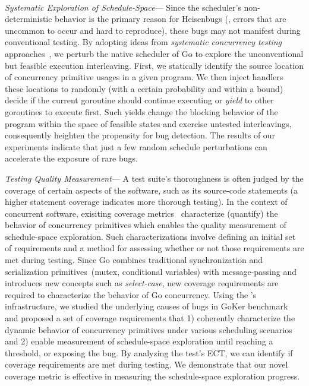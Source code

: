 \\
 \textit{Systematic Exploration of Schedule-Space}---
Since the scheduler's non-deterministic behavior is the primary reason for Heisenbugs (\ie, errors that are uncommon to occur and hard to reproduce), these bugs may not manifest during conventional testing.
%
By adopting ideas from \textit{systematic concurrency testing} approaches~\cite{dpor,thomson-concurrencyTesting-ppopp14,emmi-delayBounded-popl11,burckhardt-depthBug-asplos10,madanlal-preemptionBound-pldi07,yu-maple-oopsla12,joshi-calfuzzer,contest-jgi01,edelstein2003contest,hong-syncTesting-issta12,christakis-erlang-icst13,yuan-morpheus-asplos20}, we perturb the native scheduler of Go to explore the unconventional but feasible execution interleaving.
%
First, we statically identify the source location of concurrency primitive usages in a given program.
%
We then inject handlers these locations to randomly (with a certain probability and within a bound) decide if the current goroutine should continue executing or \textit{yield} to other goroutines to execute first.
%
Such yields change the blocking behavior of the program within the space of feasible states and exercise untested interleavings, consequently heighten the propensity for bug detection.
%
The results of our experiments indicate that just a few random schedule perturbations can accelerate the exposure of rare bugs.

 \textit{Testing Quality Measurement}---
A test suite's thoroughness is often judged by the coverage of certain aspects of the software, such as its source-code statements (a higher statement coverage indicates more thorough testing).
%
In the context of concurrent software, exisiting coverage metrics~\cite{edelstein2003contest,trainin-followsCoverage-padtad09,hong-syncTesting-issta12,yu-pset-isca09} characterize (quantify) the behavior of concurrency primitives which enables the quality measurement of schedule-space exploration.
%
Such characterizations involve defining an initial set of requirements and a method for assessing whether or not those requirements are met during testing.
%
Since Go combines traditional synchronization and serialization primitives~(mutex, conditional variables) with message-passing and introduces new concepts such as \textit{select-case}, new coverage requirements are required to characterize the behavior of Go concurrency.
%
Using the \goat's infrastructure, we studied the underlying causes of bugs in GoKer benchmark~\cite{yuan-gobench-cgo21} and proposed a set of coverage requirements that 1) coherently characterize the dynamic behavior of concurrency primitives under various scheduling scenarios and 2) enable measurement of schedule-space exploration until reaching a threshold, or exposing the bug.
%
By analyzing the test's ECT, we can identify if coverage requirements are met during testing.
%
We demonstrate that our novel coverage metric is effective in measuring the schedule-space exploration progress.


